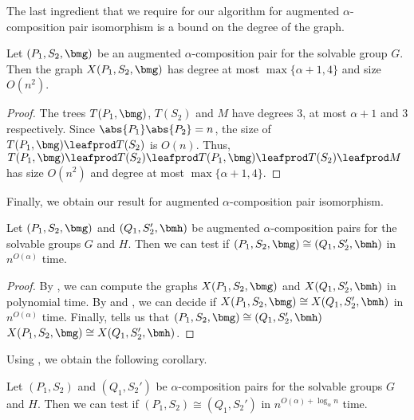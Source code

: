 The last ingredient that we require for our algorithm for augmented $\alpha$-composition pair isomorphism is a bound on the degree of the graph.

\begin{lemma}
  \label{lem:aug-alpha-graph}
  Let $(P_1, S_2, \bmg)$ be an augmented $\alpha$-composition pair for the solvable group $G$.  Then the graph $X(P_1, S_2, \bmg)$ has degree at most $\max\{\alpha + 1, 4\}$ and size $O(n^2)$.
\end{lemma}

\begin{proof}
  The trees $T(P_1, \bmg)$, $T(S_2)$ and $M$ have degrees $3$, at most $\alpha + 1$ and $3$ respectively.  Since $\abs{P_1} \abs{P_2} = n$, the size of $T(P_1, \bmg) \leafprod T(S_2)$ is $O(n)$.  Thus, $T(P_1, \bmg) \leafprod T(S_2) \leafprod T(P_1, \bmg) \leafprod T(S_2) \leafprod M$ has size $O(n^2)$ and degree at most $\max\{\alpha + 1, 4\}$.
\end{proof}

Finally, we obtain our result for augmented $\alpha$-composition pair isomorphism.

\begin{theorem}
  \label{thm:aug-alpha-iso}
  Let $(P_1, S_2, \bmg)$ and $(Q_1, S_2', \bmh)$ be augmented $\alpha$-composition pairs for the solvable groups $G$ and $H$.  Then we can test if $(P_1, S_2, \bmg) \cong (Q_1, S_2', \bmh)$ in $n^{O(\alpha)}$ time.
\end{theorem}

\begin{proof}
  By , we can compute the graphs $X(P_1, S_2, \bmg)$ and $X(Q_1, S_2', \bmh)$ in polynomial time.  By  and , we can decide if $X(P_1, S_2, \bmg) \cong X(Q_1, S_2', \bmh)$ in $n^{O(\alpha)}$ time.  Finally,  tells us that $(P_1, S_2, \bmg) \cong (Q_1, S_2', \bmh)$ \ifft $X(P_1, S_2, \bmg) \cong X(Q_1, S_2', \bmh)$.\end{proof}

Using , we obtain the following corollary.


\begin{corollary}
  \label{cor:alpha-iso}
  Let $(P_1, S_2)$ and $(Q_1, S_2')$ be $\alpha$-composition pairs for the solvable groups $G$ and $H$.  Then we can test if $(P_1, S_2) \cong (Q_1, S_2')$ in $n^{O(\alpha) + \log_{\alpha} n}$ time.
\end{corollary}

